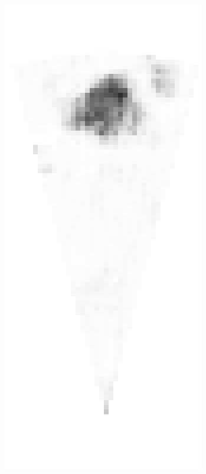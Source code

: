 \begin{figure}[!t]
{        \includegraphics[height=0.2\textheight]{chapters/images/proposals/unseen/rotating-platform-heatmap.jpg}
}
\end{figure}
